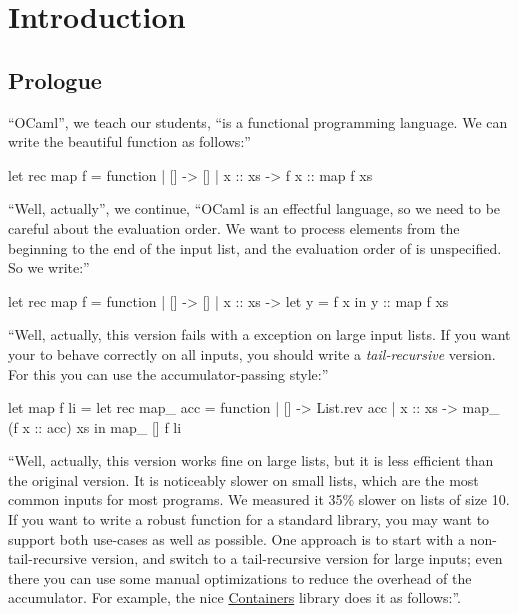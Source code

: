 \section{Introduction}

\subsection{Prologue}

``OCaml'', we teach our students, ``is a functional programming language. We can write the beautiful function  as follows:''
\begin{Ocaml}
let rec map f = function
| [] -> []
| x :: xs -> f x :: map f xs
\end{Ocaml}

``Well, actually'', we continue, ``OCaml is an effectful language, so we need to be careful about the evaluation order. We want  to process elements from the beginning to the end of the input list, and the evaluation order of  is unspecified. So we write:''
\begin{Ocaml}
let rec map f = function
| [] -> []
| x :: xs ->
  let y = f x in
  y :: map f xs
\end{Ocaml}

``Well, actually, this version fails with a 
exception on large input lists. If you want your  to behave
correctly on all inputs, you should write a \emph{tail-recursive}
version. For this you can use the accumulator-passing style:''
\begin{Ocaml}
let map f li =
  let rec map_ acc = function
  | [] -> List.rev acc
  | x :: xs -> map_ (f x :: acc) xs
  in map_ [] f li
\end{Ocaml}

``Well, actually, this version works fine on large lists, but it is
less efficient than the original version. It is noticeably slower on
small lists, which are the most common inputs for most programs. We
measured it 35\% slower on lists of size 10. If you want to write
a robust function for a standard library, you may want to support both
use-cases as well as possible. One approach is to start with
a non-tail-recursive version, and switch to a tail-recursive version
for large inputs; even there you can use some manual optimizations to
reduce the overhead of the accumulator. For example, the nice
\href{https://github.com/c-cube/ocaml-containers}{Containers} library
does it as follows:''.

